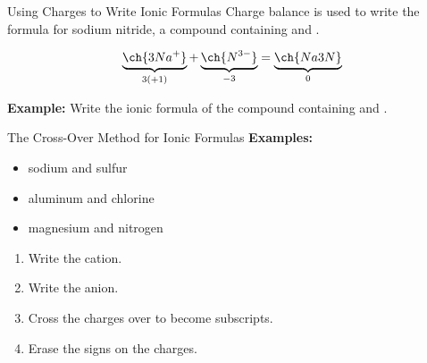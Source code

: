 \documentclass[notes=onlyslideswithnotes,notes=hide]{beamer}
\begin{document}

\begin{frame}[t]{Using Charges to Write Ionic Formulas}
	Charge balance is used to write the formula for sodium nitride, a
	compound containing  and .

	\begin{equation*}
		\underbrace{\ch{3 Na^{+}}}_{3(+1)} +
		\underbrace{\ch{N^{3-}}}_{-3} = \underbrace{\ch{Na3N}}_0
	\end{equation*}

	\textbf{Example:} Write the ionic formula of the compound containing
	 and .

\end{frame}

\begin{frame}{The Cross-Over Method for Ionic Formulas}
	\textbf{Examples:}
	\begin{itemize}
		\item sodium and sulfur     
		\item aluminum and chlorine 
		\item magnesium and nitrogen
	\end{itemize}

	\bigskip

	\begin{enumerate}[<+(1)->]
		\item Write the cation.
		\item Write the anion.
		\item Cross the charges over to become subscripts.
		\item Erase the signs on the charges.
	\end{enumerate}


\end{frame}
\end{document}
